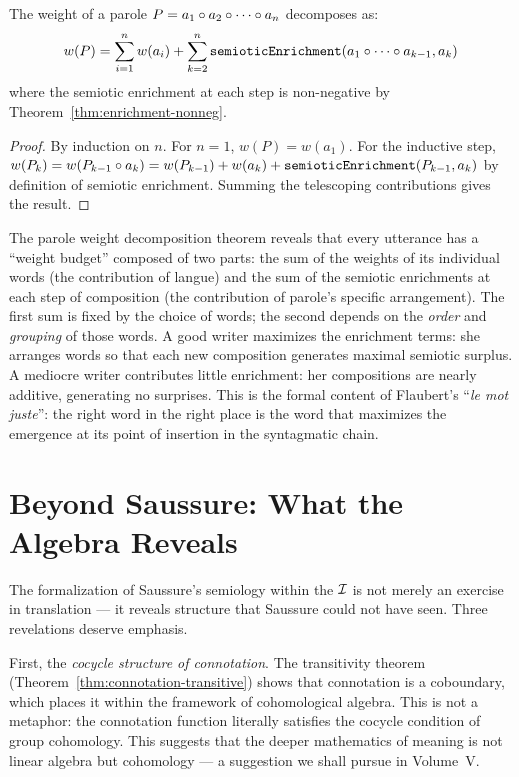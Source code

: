 \begin{theorem}
\label{thm:parole-weight-decomp}
The weight of a parole $P = a_1 \circ a_2 \circ \cdots \circ a_n$ decomposes as:
\[
  w(P) = \sum_{i=1}^{n} w(a_i) + \sum_{k=2}^{n} \texttt{semioticEnrichment}(a_1 \circ \cdots \circ a_{k-1}, a_k)
\]
where the semiotic enrichment at each step is non-negative by Theorem~\ref{thm:enrichment-nonneg}.
\end{theorem}

\begin{proof}
By induction on $n$. For $n = 1$, $w(P) = w(a_1)$. For the inductive step, $w(P_k) = w(P_{k-1} \circ a_k) = w(P_{k-1}) + w(a_k) + \texttt{semioticEnrichment}(P_{k-1}, a_k)$ by definition of semiotic enrichment. Summing the telescoping contributions gives the result.
\end{proof}

\begin{remark}
The parole weight decomposition theorem reveals that every utterance has a ``weight budget'' composed of two parts: the sum of the weights of its individual words (the contribution of langue) and the sum of the semiotic enrichments at each step of composition (the contribution of parole's specific arrangement). The first sum is fixed by the choice of words; the second depends on the \emph{order} and \emph{grouping} of those words. A good writer maximizes the enrichment terms: she arranges words so that each new composition generates maximal semiotic surplus. A mediocre writer contributes little enrichment: her compositions are nearly additive, generating no surprises. This is the formal content of Flaubert's ``\textit{le mot juste}'': the right word in the right place is the word that maximizes the emergence at its point of insertion in the syntagmatic chain.
\end{remark}

\section{Beyond Saussure: What the Algebra Reveals}

The formalization of Saussure's semiology within the $\mathcal{I}$ is not
merely an exercise in translation --- it reveals structure that
Saussure could not have seen. Three revelations deserve emphasis.

First, the \emph{cocycle structure of connotation}. The transitivity
theorem (Theorem~\ref{thm:connotation-transitive}) shows that
connotation is a coboundary, which places it within the framework of
cohomological algebra. This is not a metaphor: the connotation function
literally satisfies the cocycle condition of group cohomology. This
suggests that the deeper mathematics of meaning is not linear algebra
but cohomology --- a suggestion we shall pursue in Volume~V.

